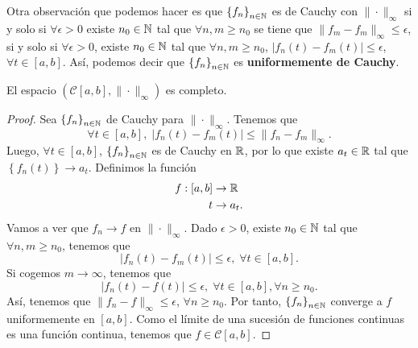 \begin{eg}
	Otra observación que podemos hacer es que $\displaystyle \left\{ f_{n}\right\} _{n\in\mathbb{N}} $ es de Cauchy con $\displaystyle \| \cdot \|_{\infty} $ si y solo si $\displaystyle \forall \epsilon > 0 $ existe $\displaystyle n_{0} \in \mathbb{N} $ tal que $\displaystyle \forall n,m \geq n_{0} $ se tiene que $\displaystyle \| f_{m}-f_{m}\|_{\infty} \leq \epsilon  $, si y solo si $\displaystyle \forall \epsilon > 0 $, existe $\displaystyle n_{0} \in \mathbb{N} $ tal que $\displaystyle \forall n,m \geq n_{0} $, $\displaystyle \left|f_{n}\left(t\right)-f_{m}\left(t\right)\right|\leq \epsilon  $, $\displaystyle \forall t \in [a,b] $.
	Así, podemos decir que $\displaystyle \left\{ f_{n}\right\} _{n\in\mathbb{N}} $ es \textbf{uniformemente de Cauchy}.
\end{eg}
\begin{theorem}
	El espacio $\displaystyle \left(\mathcal{C}[a,b],\| \cdot \|_{\infty}\right) $ es completo.
\end{theorem}
\begin{proof}
	Sea $\displaystyle \left\{ f_{n}\right\} _{n\in\mathbb{N}} $ de Cauchy para $\displaystyle \| \cdot \|_{\infty} $. Tenemos que 
	\[ \forall t \in [a,b],\; \left|f_{n}\left(t\right)-f_{m}\left(t\right)\right| \leq \|f_{n}-f_{m}\|_{\infty}.\]
	Luego, $\displaystyle \forall t \in [a,b] $, $\displaystyle \left\{ f_{n}\right\} _{n\in\mathbb{N}} $ es de Cauchy en $\displaystyle \mathbb{R} $, por lo que existe $\displaystyle a_{t} \in \mathbb{R} $ tal que $\displaystyle \left\{ f_{n}\left(t\right)\right\} \to a_{t} $.
	Definimos la función 
	\[
	\begin{split}
		f : [a,b] & \to \mathbb{R} \\
		t & \to a_{t}.
	\end{split}
	\]
	Vamos a ver que $\displaystyle f_{n} \to f $ en $\displaystyle \| \cdot \|_{\infty} $. Dado $\displaystyle \epsilon > 0 $, existe $\displaystyle n_{0} \in \mathbb{N} $ tal que $\displaystyle \forall n,m \geq n_{0} $, tenemos que 
	\[ \left|f_{n}\left(t\right) - f_{m}\left(t\right)\right| \leq \epsilon , \; \forall t \in [a,b] .\]
	Si cogemos $\displaystyle m \to \infty $, tenemos que
	\[ \left|f_{n}\left(t\right) -f\left(t\right)\right| \leq \epsilon, \; \forall t \in \left[a,b\right] , \forall n \geq n_{0} .\]
	Así, tenemos que $\displaystyle \|f_{n}-f\|_{\infty} \leq \epsilon  $, $\displaystyle \forall n \geq n_{0} $. Por tanto, $\displaystyle \left\{ f_{n}\right\} _{n\in\mathbb{N}} $ converge a $\displaystyle f $ uniformemente en $\displaystyle [a,b] $.
	Como el límite de una sucesión de funciones continuas es una función continua, tenemos que $\displaystyle f \in \mathcal{C}[a,b] $.
\end{proof}
